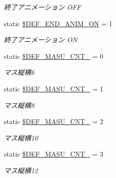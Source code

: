 \begin{DoxyCompactItemize}
\begin{DoxyCompactList}\small\item\em 終了アニメーション O\+FF \end{DoxyCompactList}\item 
\mbox{\label{class_reversi_const_ad0da61a2d5650bdefb8db60d69d686ed}} 
static \hyperlink{class_reversi_const_ad0da61a2d5650bdefb8db60d69d686ed}{\$\+D\+E\+F\+\_\+\+E\+N\+D\+\_\+\+A\+N\+I\+M\+\_\+\+ON} = 1
\begin{DoxyCompactList}\small\item\em 終了アニメーション ON \end{DoxyCompactList}\item 
\mbox{\label{class_reversi_const_a2dd1b7bb9f8733961e1b526d977bf64e}} 
static \hyperlink{class_reversi_const_a2dd1b7bb9f8733961e1b526d977bf64e}{\$\+D\+E\+F\+\_\+\+M\+A\+S\+U\+\_\+\+C\+N\+T\+\_} = 0
\begin{DoxyCompactList}\small\item\em マス縦横6 \end{DoxyCompactList}\item 
\mbox{\label{class_reversi_const_a3768b1d96ac805b361ba9c1ee64b68c3}} 
static \hyperlink{class_reversi_const_a3768b1d96ac805b361ba9c1ee64b68c3}{\$\+D\+E\+F\+\_\+\+M\+A\+S\+U\+\_\+\+C\+N\+T\+\_} = 1
\begin{DoxyCompactList}\small\item\em マス縦横8 \end{DoxyCompactList}\item 
\mbox{\label{class_reversi_const_a229d8a2af11898150ee33606343c7deb}} 
static \hyperlink{class_reversi_const_a229d8a2af11898150ee33606343c7deb}{\$\+D\+E\+F\+\_\+\+M\+A\+S\+U\+\_\+\+C\+N\+T\+\_} = 2
\begin{DoxyCompactList}\small\item\em マス縦横10 \end{DoxyCompactList}\item 
\mbox{\label{class_reversi_const_a9334dcfbdeb613964a57a2aa7dfb0622}} 
static \hyperlink{class_reversi_const_a9334dcfbdeb613964a57a2aa7dfb0622}{\$\+D\+E\+F\+\_\+\+M\+A\+S\+U\+\_\+\+C\+N\+T\+\_} = 3
\begin{DoxyCompactList}\small\item\em マス縦横12 \end{DoxyCompactList}\item 

\end{DoxyCompactItemize}
